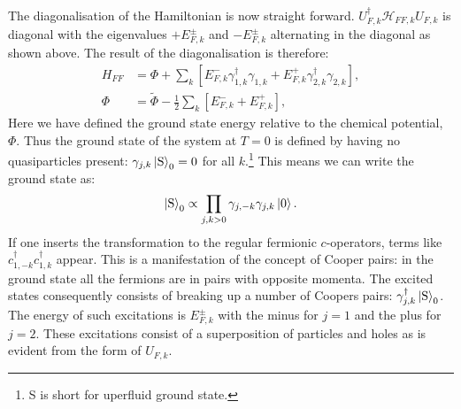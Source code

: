 The diagonalisation of the Hamiltonian is now straight forward. $U^\dagger_{F,k}\mathcal{H}_{FF,k}U_{F,k}$ is diagonal with the eigenvalues $+E^{\pm}_{F,k}$ and $-E^{\pm}_{F,k}$ alternating in the diagonal as shown above. The result of the diagonalisation is therefore:
\begin{align}
H_{FF} &= \Phi + \sum_{k} \left[ E^{-}_{F,k}\gamma^\dagger_{1, k}\gamma_{1, k} + E^{+}_{F,k}\gamma^\dagger_{2, k}\gamma_{2, k} \right], \nonumber \\ 
\Phi &= \tilde{\Phi} - \frac{1}{2}\sum_k \left[ E^{-}_{F,k} + E^{+}_{F,k} \right], 
\label{eq.2wiresDiagonalisedHamiltonian}
\end{align}  
Here we have defined the ground state energy relative to the chemical potential, $\Phi$. Thus the ground state of the system at $T = 0$ is defined by having no quasiparticles present: $\gamma_{j,k} \ket{\text{S}}_0 = 0$ for all $k$.\footnote{S is short for uperfluid ground state.} This means we can write the ground state as:
\begin{equation}
\ket{\text{S}}_0 \propto \prod_{j,k > 0} \gamma_{j,-k}\gamma_{j,k}\ket{0}.
\label{eq.superfluidgroundstate}
\end{equation}
If one inserts the transformation to the regular fermionic $c$-operators, terms like $c^\dagger_{1,-k}c^\dagger_{1,k}$ appear. This is a manifestation of the concept of Cooper pairs: in the ground state all the fermions are in pairs with opposite momenta. The excited states consequently consists of breaking up a number of Coopers pairs: $\gamma^\dagger_{j,k}\ket{\text{S}}_0$. The energy of such excitations is $E^{\pm}_{F,k}$ with the minus for $j = 1$ and the plus for $j = 2$. These excitations consist of a superposition of particles and holes as is evident from the form of $U_{F,k}$. 

